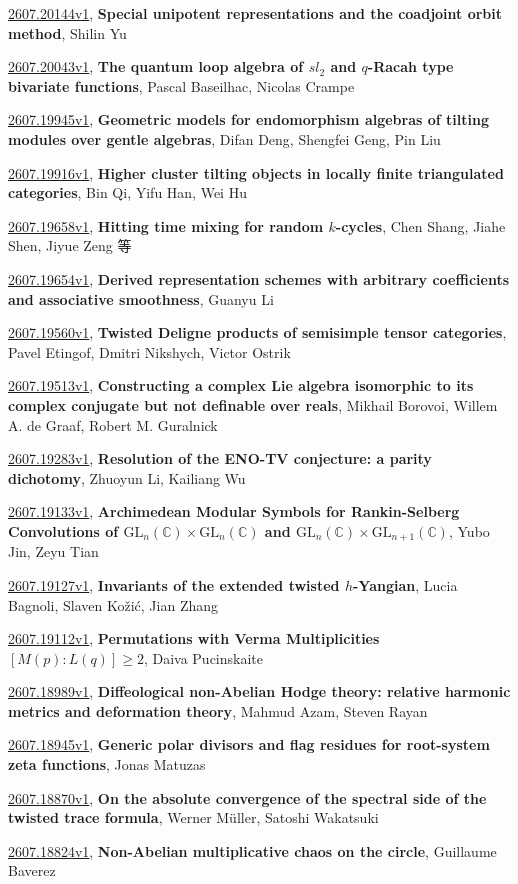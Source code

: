 \documentclass[9pt, a4paper]{article}
\theoremstyle{plain}
\theoremstyle{definition}
\theoremstyle{remark}
\newcommand{\arxiv}[3]{\href{https://arxiv.org/abs/#1}{#1}, \textbf{\textcolor{arxivblue}{#2}}, #3}
\begin{document}
\arxiv{2607.20144v1}{Special unipotent representations and the coadjoint orbit method}{Shilin Yu}

\arxiv{2607.20043v1}{The quantum loop algebra of $sl_2$ and $q$-Racah type bivariate functions}{Pascal Baseilhac, Nicolas Crampe}

\arxiv{2607.19945v1}{Geometric models for endomorphism algebras of tilting modules over gentle algebras}{Difan Deng, Shengfei Geng, Pin Liu}

\arxiv{2607.19916v1}{Higher cluster tilting objects in locally finite triangulated categories}{Bin Qi, Yifu Han, Wei Hu}

\arxiv{2607.19658v1}{Hitting time mixing for random $k$-cycles}{Chen Shang, Jiahe Shen, Jiyue Zeng 等}

\arxiv{2607.19654v1}{Derived representation schemes with arbitrary coefficients and associative smoothness}{Guanyu Li}

\arxiv{2607.19560v1}{Twisted Deligne products of semisimple tensor categories}{Pavel Etingof, Dmitri Nikshych, Victor Ostrik}

\arxiv{2607.19513v1}{Constructing a complex Lie algebra isomorphic to its complex conjugate but not definable over reals}{Mikhail Borovoi, Willem A. de Graaf, Robert M. Guralnick}

\arxiv{2607.19283v1}{Resolution of the ENO-TV conjecture: a parity dichotomy}{Zhuoyun Li, Kailiang Wu}

\arxiv{2607.19133v1}{Archimedean Modular Symbols for Rankin-Selberg Convolutions of $\mathrm{GL}_n(\mathbb{C})\times\mathrm{GL}_n(\mathbb{C})$ and $\mathrm{GL}_n(\mathbb{C})\times\mathrm{GL}_{n+1}(\mathbb{C})$}{Yubo Jin, Zeyu Tian}

\arxiv{2607.19127v1}{Invariants of the extended twisted $h$-Yangian}{Lucia Bagnoli, Slaven Kožić, Jian Zhang}

\arxiv{2607.19112v1}{Permutations with Verma Multiplicities $[M(p):L(q)] \geq 2$}{Daiva Pucinskaite}

\arxiv{2607.18989v1}{Diffeological non-Abelian Hodge theory: relative harmonic metrics and deformation theory}{Mahmud Azam, Steven Rayan}

\arxiv{2607.18945v1}{Generic polar divisors and flag residues for root-system zeta functions}{Jonas Matuzas}

\arxiv{2607.18870v1}{On the absolute convergence of the spectral side of the twisted trace formula}{Werner Müller, Satoshi Wakatsuki}

\arxiv{2607.18824v1}{Non-Abelian multiplicative chaos on the circle}{Guillaume Baverez}
\end{document}

